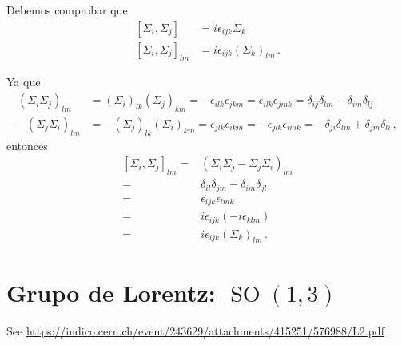 Debemos comprobar que
\begin{align}
  \left[{\Sigma_i},{\Sigma_j}\right]&=i\epsilon_{ijk}{\Sigma_k}\nonumber\\
  \left[{\Sigma_i},{\Sigma_j}\right]_{lm}&=i\epsilon_{ijk}(\Sigma_k)_{lm}\,.
\end{align}

Ya que
\begin{align}
  \label{eq:167}
  (\Sigma_i\Sigma_j)_{lm}&=(\Sigma_i)_{lk}(\Sigma_j)_{km}=-\epsilon_{ilk}\epsilon_{jkm}=\epsilon_{ilk}\epsilon_{jmk}=\delta_{ij}\delta_{lm}-\delta_{im}\delta_{lj}\nonumber\\
  -(\Sigma_j\Sigma_i)_{lm}&=-(\Sigma_j)_{lk}(\Sigma_i)_{km}=\epsilon_{jlk}\epsilon_{ikm}=-\epsilon_{jlk}\epsilon_{imk}=-\delta_{ji}\delta_{lm}+\delta_{jm}\delta_{li}\,,
\end{align}
entonces
\begin{align}
\label{eq:adjrepsu2}
[\Sigma_i,\Sigma_j]_{lm}=& (\Sigma_i\Sigma_j-\Sigma_j\Sigma_i)_{lm}\nonumber\\
=&\delta_{il}\delta_{jm}-\delta_{im}\delta_{jl}\nonumber\\
=&\epsilon_{ijk}\epsilon_{lmk}\nonumber\\
=&i\epsilon_{ijk}(-i\epsilon_{klm})\nonumber\\
=&i\epsilon_{ijk}(\Sigma_k)_{lm}\,.
\end{align}




\section{Grupo de Lorentz: $\operatorname{SO}(1,3)$}
\label{sec:glso13}

See \url{https://indico.cern.ch/event/243629/attachments/415251/576988/L2.pdf}

